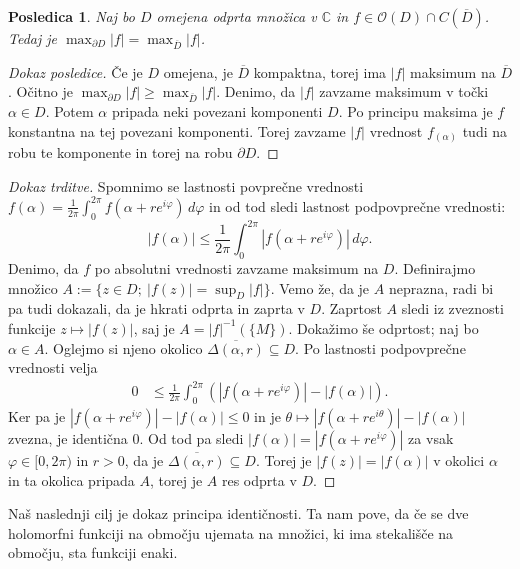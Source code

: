\documentclass[10pt, a4paper]{article}
\newtheorem{posledica}[izr]{Posledica}
\newenvironment{noticeC}{%
  \tcolorbox[%
  notitle,
  empty,
  enhanced,  %
  breakable,
  coltext=black, 
  fontupper=\rmfamily,
  parbox=false,
  noparskip,
  sharp corners,
  boxrule=-1pt,  %
  frame hidden,
  left=7pt,  %
  right=7pt,
  top=5pt,
  bottom=5pt,
  before skip=2.5ex plus 2pt,
  after skip=2.5ex plus 2pt,
  overlay unbroken and last={%
  },
  ]}
{\endtcolorbox}
\newenvironment{dokaz}%
  {\begin{noticeC}\begin{proof}}%
  {\end{proof}\end{noticeC}}
\newcommand{\C}{\mathbb {C}}
\begin{document}
\begin{posledica}
  Naj bo $D$ omejena odprta množica v $\C$ in $f \in \mathcal{O}(D) \cap C(\overline{D})$.
  Tedaj je $\max_{\partial D} |f| = \max_ {\overline{D}} |f|$. 
\end{posledica}

\begin{dokaz}[Dokaz posledice]
  Če je $D$ omejena, je $\overline{D}$ kompaktna, torej ima $|f|$
  maksimum na $\overline{D}$. Očitno je $\max_{\partial D} |f| \geq \max_{\overline{D}} |f|$.
  Denimo, da $|f|$ zavzame maksimum v točki $\alpha \in D$.
  Potem $\alpha$ pripada neki povezani komponenti $D$.
  Po principu maksima je $f$ konstantna na tej povezani komponenti.
  Torej zavzame $|f|$ vrednost $f_{(\alpha)}$ tudi na robu te komponente
  in torej na robu $\partial D$.
\end{dokaz}

\begin{dokaz}[Dokaz trditve]
  Spomnimo se lastnosti povprečne vrednosti $f(\alpha) = \frac{1}{2\pi} \int_0 ^{2\pi} f(\alpha + re^{i\varphi})\, d\varphi$
  in od tod sledi lastnost podpovprečne vrednosti:
  $$|f(\alpha)| \leq \frac{1}{2\pi} \int_0 ^{2\pi} |f(\alpha + re^{i \varphi})|\, d\varphi.$$
  Denimo, da $f$ po absolutni vrednosti zavzame maksimum na $D$.
  Definirajmo množico $A := \{z \in D;\ |f(z)| = \sup_D |f|\}$.
  Vemo že, da je $A$ neprazna, radi bi pa tudi dokazali,
  da je hkrati odprta in zaprta v $D$.
  Zaprtost $A$ sledi iz zveznosti funkcije $z \mapsto |f(z)|$,
  saj je $A = |f|^{-1} (\{M\})$.
  Dokažimo še odprtost; naj bo $\alpha \in A$.
  Oglejmo si njeno okolico $\overline{\Delta (\alpha, r)} \subseteq D$.
  Po lastnosti podpovprečne vrednosti velja 
  \begin{align*}
    0 &\leq \frac{1}{2\pi} \int_0 ^{2\pi} (|f(\alpha + re^{i \varphi})| - |f(\alpha)|).
  \end{align*}
  Ker pa je $|f(\alpha + re^{i \varphi})| - |f(\alpha)| \leq 0$
  in je $\theta \mapsto |f(\alpha + re^{i \theta})| - |f(\alpha)|$
  zvezna, je identična $0$.
  Od tod pa sledi $|f(\alpha)| = |f(\alpha + re^{i\varphi})|$ za vsak $\varphi \in [0, 2\pi)$
  in $r >0$, da je $\overline{\Delta(\alpha, r)} \subseteq D$.
  Torej je $|f(z)| = |f(\alpha)|$ v okolici $\alpha$ in ta okolica pripada $A$, torej 
  je $A$ res odprta v $D$.
\end{dokaz}

Naš naslednji cilj je dokaz principa identičnosti. Ta nam pove, da če se dve holomorfni 
funkciji na območju ujemata na množici, ki ima stekališče na območju, 
sta funkciji enaki.
\end{document}
